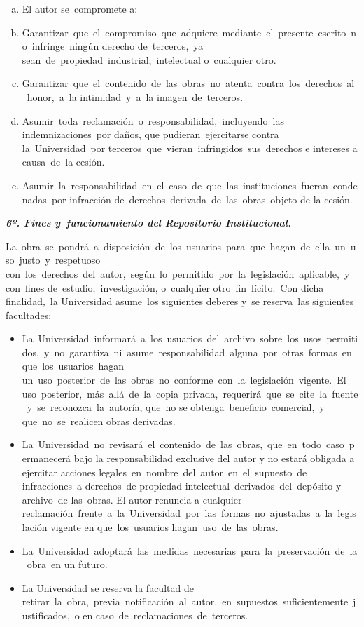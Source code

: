 \begin{enumerate}[(a)]
	\item El autor se compromete a: 
	\item Garantizar que el compromiso que adquiere mediante el presente escrito no infringe ningún derecho de terceros, ya sean de propiedad industrial, intelectual o cualquier otro. 
	\item Garantizar que el contenido de las obras no atenta contra los derechos al honor, a la intimidad y a la imagen de terceros.
	\item Asumir toda reclamación o responsabilidad, incluyendo las indemnizaciones por daños, que pudieran ejercitarse contra la Universidad por terceros que vieran infringidos sus derechos e intereses a causa de la cesión. 
	\item Asumir la responsabilidad en el caso de que las instituciones fueran condenadas por infracción de derechos derivada de las obras objeto de la cesión.
\end{enumerate}

\vspace*{1em}
\textbf{\textit{6º. Fines y funcionamiento del Repositorio Institucional.}}
\vspace*{1em}

La obra se pondrá a disposición de los usuarios para que hagan de ella un uso justo y respetuoso con los derechos del autor, según lo permitido por la legislación aplicable, y con fines de estudio, investigación, o cualquier otro fin lícito. Con dicha finalidad, la Universidad asume los siguientes deberes y se reserva las siguientes facultades: 

\begin{itemize}
	\item La Universidad informará a los usuarios del archivo sobre los usos permitidos, y no garantiza ni asume responsabilidad alguna por otras formas en que los usuarios hagan un uso posterior de las obras no conforme con la legislación vigente. El uso posterior, más allá de la copia privada, requerirá que se cite la fuente y se reconozca la autoría, que no se obtenga beneficio comercial, y que no se realicen obras derivadas.
	\item La Universidad no revisará el contenido de las obras, que en todo caso permanecerá bajo la responsabilidad exclusive del autor y no estará obligada a ejercitar acciones legales en nombre del autor en el supuesto de infracciones a derechos de propiedad intelectual derivados del depósito y archivo de las obras. El autor renuncia a cualquier reclamación frente a la Universidad por las formas no ajustadas a la legislación vigente en que los usuarios hagan uso de las obras.
	\item La Universidad adoptará las medidas necesarias para la preservación de la obra en un futuro. 
	\item La Universidad se reserva la facultad de retirar la obra, previa notificación al autor, en supuestos suficientemente justificados, o en caso de reclamaciones de terceros. 
\end{itemize}

